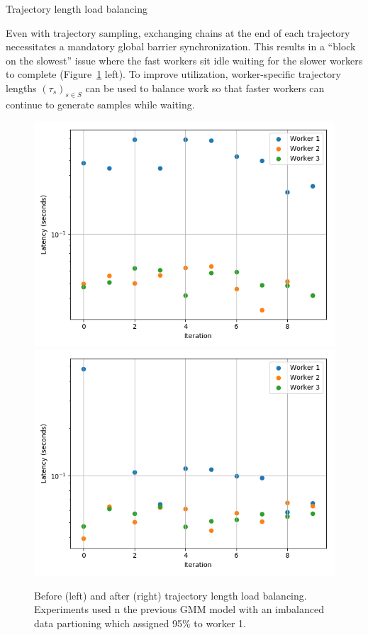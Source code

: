 \documentclass[final]{beamer}
\newlength{\onecolwid}
\newlength{\twocolwid}
\begin{document}
\begin{frame}[t]
\begin{columns}[t]
\begin{column}{\twocolwid}
\begin{columns}[t,totalwidth=\twocolwid]
\begin{column}{\onecolwid}
\begin{block}{Trajectory length load balancing}

  Even with trajectory sampling, exchanging chains at the end of each trajectory necessitates
  a mandatory global barrier synchronization. This results in a ``block on the slowest'' issue where
  the fast workers sit idle waiting for the slower workers to complete (Figure~\ref{fig:load-balancing} left).
  To improve utilization, worker-specific trajectory lengths $(\tau_s)_{s \in S}$ can be used to balance work
  so that faster workers can continue to generate samples while waiting.

  \begin{figure}
    \includegraphics[width=0.5\linewidth]{poster-figures/load-balancing-none.png}
    \includegraphics[width=0.5\linewidth]{poster-figures/load-balancing.png}
    \caption{Before (left) and after (right) trajectory length load balancing. Experiments used
      n the previous GMM model with an imbalanced data partioning which assigned 95\% to worker 1.}
    \label{fig:load-balancing}
  \end{figure}

\end{block}



\end{column} %

\end{columns} %



\end{column}
\end{columns}
\end{frame}
\end{document}
